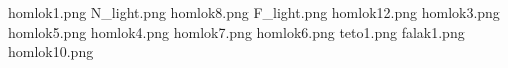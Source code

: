 homlok1.png
N_light.png
homlok8.png
F_light.png
homlok12.png
homlok3.png
homlok5.png
homlok4.png
homlok7.png
homlok6.png
teto1.png
falak1.png
homlok10.png
